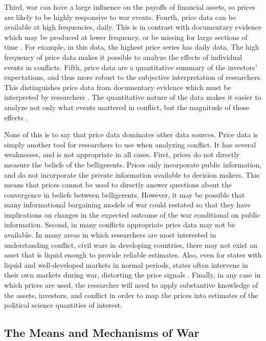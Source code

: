 Third, war can have a large influence on the payoffs of financial assets, so prices are likely to be highly responsive to war events.
Fourth, price data can be available at high frequencies, \eg{} daily.
This is in contrast with documentary evidence which may be produced at lower frequency, or be missing for large sections of time \parencite[][57]{Reiter2009}. For example, in this data, the highest price series has daily data.
The high frequency of price data makes it possible to analyze the effects of individual events in conflicts.
Fifth, price data are a quantitative summary of the investors' expectations, and thus more robust to the subjective interpretation of researchers.
This distinguishes price data from documentary evidence which must be interpreted by researchers \parencite[][58]{Reiter2009}.
The quantitative nature of the data makes it easier to analyze not only what events mattered in conflict, but the magnitude of those effects \parencite{north2000introd}.

None of this is to say that price data dominates other data sources.
Price data is simply another tool for researchers to use when analyzing conflict. It has several weaknesses, and is not appropriate in all cases.
First, prices do not directly measure the beliefs of the belligerents. Prices only incorporate public information, and do not incorporate the private information available to decision makers.
This means that prices cannot be used to directly answer questions about the convergence in beliefs between belligerents.
However, it may be possible that many informational bargaining models of war could restated so that they have implications on changes in the expected outcome of the war conditional on public information.
Second, in many conflicts appropriate price data may not be available.
In many areas in which researchers are most interested in understanding conflict, \eg{} civil wars in developing countries, there may not exist an asset that is liquid enough to provide reliable estimates.
Also, even for states with liquid and well-developed markets in normal periods, states often intervene in their own markets during war, distorting the price signals \parencite[12]{HaberMitchenerOosterlinckEtAl2015}. Finally, in any case in which prices are used, the researcher will need to apply substantive knowledge of the assets, investors, and conflict in order to map the prices into estimates of the political science quantities of interest.




\subsection{The Means and Mechanisms of War}
\label{bonds_battles:sec:means-mechanisms-war}

